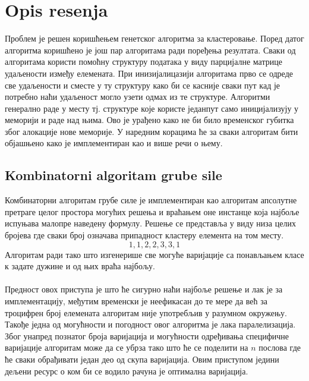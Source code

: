 \documentclass{article}
\begin{document}
\newpage
\section{Opis resenja}
Проблем је решен коришћењем генетског алгоритма за кластеровање. Поред датог алгоритма коришћено је још пар алгоритама ради поређења резултата. Сваки од алгоритама користи помоћну структуру података у виду парцијалне матрице удаљености између елемената. При инизијалицазији алгоритама прво се одреде све удаљености и сместе у ту структуру како би се касније сваки пут кад је потребно наћи удаљеност могло узети одмах из те структуре. Алгоритми генерално раде у месту тј. структуре које користе једанпут само иницијализују у меморији и раде над њима. Ово је урађено како не би било временског губитка због алокације нове меморије. У наредним корацима ће за сваки алгоритам бити објашњено како је имплементиран као и више речи о њему.

\subsection{Kombinatorni algoritam grube sile}
Комбинаторни алгоритам грубе силе је имплементиран као алгоритам апсолутне претраге целог простора могућих решења и враћањем оне инстанце која најбоље испуњава малопре наведену формулу.
Решење се представља у виду низа целих бројева где сваки број означава припадност кластеру елемента на том месту.
\begin{displaymath}
1,1,2,2,3,3,1
\end{displaymath}
Алгоритам ради тако што изгенерише све могуће варијације са понављањем класе к задате дужине и од њих враћа најбољу.
\\\\Предност овох приступа је што ће сигурно наћи најбоље решење и лак је за имплементацију, међутим временски је неефикасан до те мере да већ за троцифрен број елемената алгоритам није употребљив у разумном окружењу.
Такође једна од могућности и погодност овог алгоритма је лака паралелизација.
Због унапред познатог броја варијација и могућности одређивања специфичне варијације алгоритам може да се убрза тако што ће се поделити на $n$ послова где ће сваки обрађивати један део од скупа варијација.
Овим приступом једини дељени ресурс о ком би се водило рачуна је оптимална варијација.
\end{document}
